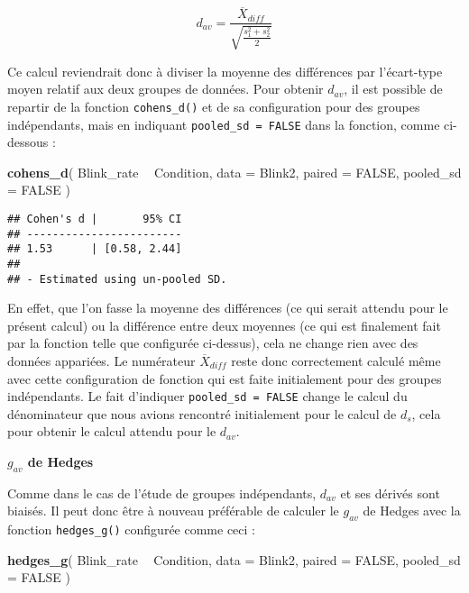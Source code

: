 \documentclass[
  french,
]{book}
\newenvironment{Shaded}{\begin{snugshade}}{\end{snugshade}}
\newcommand{\DataTypeTok}[1]{\textcolor[rgb]{0.13,0.29,0.53}{#1}}
\newcommand{\KeywordTok}[1]{\textcolor[rgb]{0.13,0.29,0.53}{\textbf{#1}}}
\newcommand{\NormalTok}[1]{#1}
\newcommand{\OperatorTok}[1]{\textcolor[rgb]{0.81,0.36,0.00}{\textbf{#1}}}
\newcommand{\OtherTok}[1]{\textcolor[rgb]{0.56,0.35,0.01}{#1}}
\newcommand{\StringTok}[1]{\textcolor[rgb]{0.31,0.60,0.02}{#1}}
\begin{document}
\[d_{av} = \frac{\overline{X} _{diff}}{\sqrt{\frac{s_{1}^2 + s_{2}^2} {2}}}\]

Ce calcul reviendrait donc à diviser la moyenne des différences par l'écart-type moyen relatif aux deux groupes de données. Pour obtenir \(d_{av}\), il est possible de repartir de la fonction \texttt{cohens\_d()} et de sa configuration pour des groupes indépendants, mais en indiquant \texttt{pooled\_sd\ =\ FALSE} dans la fonction, comme ci-dessous :

\begin{Shaded}
\begin{Highlighting}[]
\KeywordTok{cohens_d}\NormalTok{(}
\NormalTok{  Blink_rate }\OperatorTok{~}\StringTok{ }\NormalTok{Condition,}
  \DataTypeTok{data =}\NormalTok{ Blink2, }
  \DataTypeTok{paired =} \OtherTok{FALSE}\NormalTok{, }
  \DataTypeTok{pooled_sd =} \OtherTok{FALSE}
\NormalTok{  )}
\end{Highlighting}
\end{Shaded}

\begin{verbatim}
## Cohen's d |       95% CI
## ------------------------
## 1.53      | [0.58, 2.44]
## 
## - Estimated using un-pooled SD.
\end{verbatim}

En effet, que l'on fasse la moyenne des différences (ce qui serait attendu pour le présent calcul) ou la différence entre deux moyennes (ce qui est finalement fait par la fonction telle que configurée ci-dessus), cela ne change rien avec des données appariées. Le numérateur \(\overline{X} _{diff}\) reste donc correctement calculé même avec cette configuration de fonction qui est faite initialement pour des groupes indépendants. Le fait d'indiquer \texttt{pooled\_sd\ =\ FALSE} change le calcul du dénominateur que nous avions rencontré initialement pour le calcul de \(d_{s}\), cela pour obtenir le calcul attendu pour le \(d_{av}\).

\textbf{\(g_{av}\) de Hedges}

Comme dans le cas de l'étude de groupes indépendants, \(d_{av}\) et ses dérivés sont biaisés. Il peut donc être à nouveau préférable de calculer le \(g_{av}\) de Hedges avec la fonction \texttt{hedges\_g()} configurée comme ceci :

\begin{Shaded}
\begin{Highlighting}[]
\KeywordTok{hedges_g}\NormalTok{(}
\NormalTok{  Blink_rate }\OperatorTok{~}\StringTok{ }\NormalTok{Condition,}
  \DataTypeTok{data =}\NormalTok{ Blink2, }
  \DataTypeTok{paired =} \OtherTok{FALSE}\NormalTok{, }
  \DataTypeTok{pooled_sd =} \OtherTok{FALSE}
\NormalTok{  )}
\end{Highlighting}
\end{Shaded}
\end{document}
